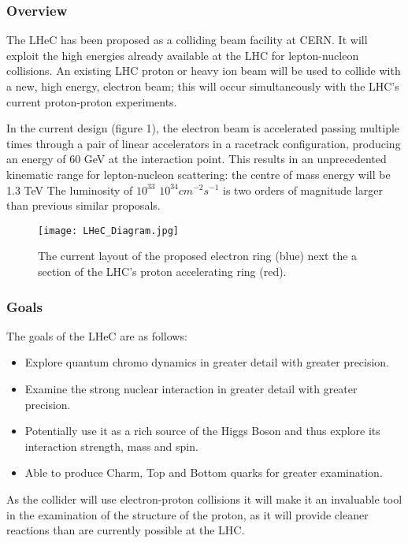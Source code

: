 \subsubsection{Overview \cite{LHeC:Birmingham}}

The LHeC has been proposed as a colliding beam facility at CERN. It will exploit the high energies already available at the LHC for lepton-nucleon collisions. An existing LHC proton or heavy ion beam will be used to collide with a new, high energy, electron beam; this will occur simultaneously with the LHC’s current proton-proton experiments.
 
In the current design (figure 1), the electron beam is accelerated passing multiple times through a pair of linear accelerators in a racetrack configuration, producing an energy of 60 GeV at the interaction point. This results in an unprecedented kinematic range for lepton-nucleon scattering: the centre of mass energy will be 1.3 TeV The luminosity of $10^{33}$ \textemdash $10^{34} cm^{-2}s^{-1}$ is two orders of magnitude larger than previous similar proposals.

\begin{figure}[!htb]
\centering
\texttt{[image: LHeC\_Diagram.jpg]}
\caption{The current layout of the proposed electron ring (blue) next the a section of the LHC’s proton accelerating ring (red).
}
\end{figure}

\subsubsection{Goals}

The goals of the LHeC are as follows:
\begin{itemize}
\item Explore quantum chromo dynamics in greater detail with greater precision.
\item Examine the strong nuclear interaction in greater detail with greater precision.
\item Potentially use it as a rich source of the Higgs Boson and thus explore its interaction strength, mass and spin.
\item Able to produce Charm, Top and Bottom quarks for greater examination.
\end{itemize}
As the collider will use electron-proton collisions it will make it an invaluable tool in the examination of the structure of the proton, as it will provide cleaner reactions than are currently possible at the LHC.
 
